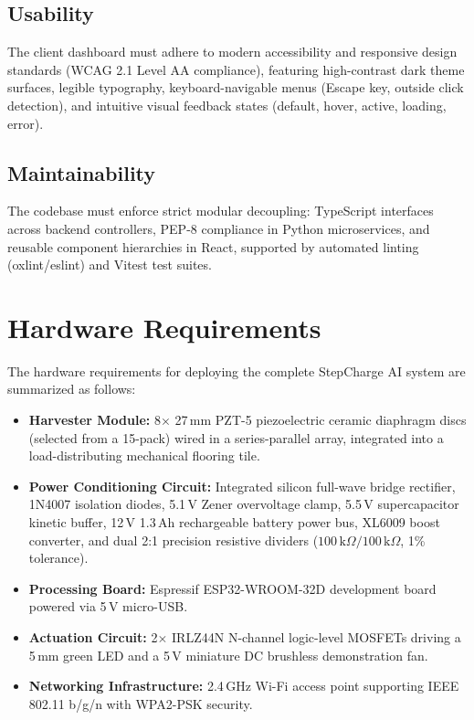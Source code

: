 \subsection{Usability}
The client dashboard must adhere to modern accessibility and responsive design standards (WCAG 2.1 Level AA compliance), featuring high-contrast dark theme surfaces, legible typography, keyboard-navigable menus (Escape key, outside click detection), and intuitive visual feedback states (default, hover, active, loading, error).

\subsection{Maintainability}
The codebase must enforce strict modular decoupling: TypeScript interfaces across backend controllers, PEP-8 compliance in Python microservices, and reusable component hierarchies in React, supported by automated linting (oxlint/eslint) and Vitest test suites.

\section{Hardware Requirements}
The hardware requirements for deploying the complete StepCharge AI system are summarized as follows:
\begin{itemize}
    \item \textbf{Harvester Module:} 8$\times$ 27\,mm PZT-5 piezoelectric ceramic diaphragm discs (selected from a 15-pack) wired in a series-parallel array, integrated into a load-distributing mechanical flooring tile.
    \item \textbf{Power Conditioning Circuit:} Integrated silicon full-wave bridge rectifier, 1N4007 isolation diodes, 5.1\,V Zener overvoltage clamp, 5.5\,V supercapacitor kinetic buffer, 12\,V 1.3\,Ah rechargeable battery power bus, XL6009 boost converter, and dual 2:1 precision resistive dividers ($100\,\text{k}\Omega / 100\,\text{k}\Omega$, 1\% tolerance).
    \item \textbf{Processing Board:} Espressif ESP32-WROOM-32D development board powered via 5\,V micro-USB.
    \item \textbf{Actuation Circuit:} 2$\times$ IRLZ44N N-channel logic-level MOSFETs driving a 5\,mm green LED and a 5\,V miniature DC brushless demonstration fan.
    \item \textbf{Networking Infrastructure:} 2.4\,GHz Wi-Fi access point supporting IEEE 802.11 b/g/n with WPA2-PSK security.
\end{itemize}

